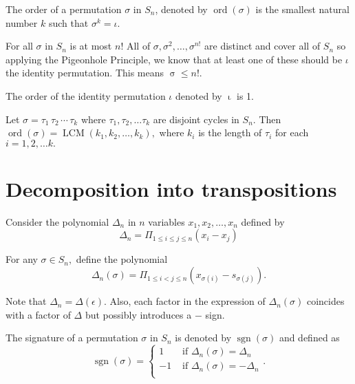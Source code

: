 
\begin{definition}
The order of a permutation $\sigma$ in $S_n$, denoted by $\operatorname{ord}(\sigma)$
is the smallest natural number $k$ such that $\sigma^k = \iota.$
\end{definition}

\begin{remark}
	For all $ \sigma$ in $S_n$ is at most $n!$ All of $ \sigma, \sigma^2, \dotsc, \sigma^{n!}$
	are distinct and cover all of $S_n$ so applying the Pigeonhole Principle, we know 
	that at least one of these should be $ \iota$ the identity permutation. This means
	$\operatorname{ \sigma} \leq n!.$ 
\end{remark}

\begin{remark}
	The order of the identity permutation $ \iota$ denoted by $\operatorname{ \iota} $
	is 1.
\end{remark}

\begin{corollary}
	Let $ \sigma = \tau_1 \, \tau_2 \, \cdots \, \tau_k$ where $ \tau_1, \tau_2, \dotsc
	\tau_k$ are disjoint cycles in $S_n.$ Then $\operatorname{ord}( \sigma) = 
	\operatorname{LCM}(k_1, k_2, \dotsc, k_k),$ where $k_i$ is the length of $ \tau_i$
	for each $i = 1, 2, \dotsc k.$
\end{corollary}

\section{Decomposition into transpositions}
Consider the polynomial $ \Delta_n$ in $n$ variables $x_1, x_2, \dotsc, x_n$ defined
by
$$ \Delta_n = \Pi _{1 \leq i \leq j \leq n} (x_i - x_j) $$

For any $ \sigma \in S_n,$ define the polynomial
$$ \Delta_n( \sigma) = \Pi _{1 \leq i < j \leq n} ( x _{\sigma(i) } - s _{ \sigma(j)} ). $$

Note that $ \Delta_n = \Delta( \epsilon) .$
Also, each factor in the expression of $ \Delta_n( \sigma) $ coincides with a factor of
$ \Delta $ but possibly introduces a $-$ sign.

\begin{definition}
	The signature of a permutation $ \sigma$ in $S_n$ is denoted by $\operatorname{sgn}
	( \sigma)$ and defined as
	$$ \operatorname{sgn}( \sigma) = \begin{cases}
	1 & \text{ if } \Delta_n(\sigma) = \Delta_n \\
	-1 & \text{ if } \Delta_n( \sigma) = - \Delta_n \\
	\end{cases}. $$
\end{definition}


